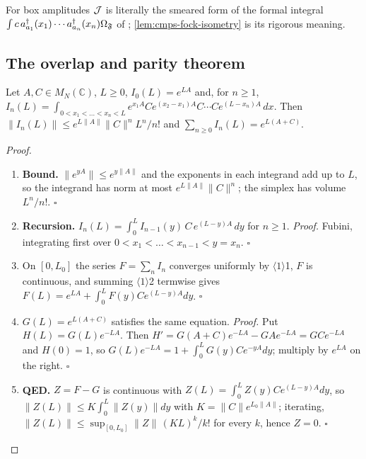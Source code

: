 For box amplitudes $\mathcal J$ is literally the smeared form of the formal integral
$\int c\,a^\dagger_{a_1}(x_1)\cdots a^\dagger_{a_n}(x_n)\Omega_{\mathfrak F}$ of
\cite{haegeman2013calculus}; \cref{lem:cmps-fock-isometry} is its rigorous meaning.

\subsection{The overlap and parity theorem}

\begin{lemma}
\label{lem:dyson-series}
Let $A,C\in M_N(\mathbb C)$, $L\ge0$, $I_0(L)=e^{LA}$ and, for $n\ge1$,
$I_n(L)=\int_{0<x_1<\dots<x_n<L}e^{x_1A}Ce^{(x_2-x_1)A}C\cdots Ce^{(L-x_n)A}\,dx$. Then
$\|I_n(L)\|\le e^{L\|A\|}\|C\|^nL^n/n!$ and $\sum_{n\ge0}I_n(L)=e^{L(A+C)}$.
\end{lemma}

\begin{proof}
\begin{enumerate}
\item[$\langle1\rangle$1.] \textbf{Bound.} $\|e^{yA}\|\le e^{y\|A\|}$ and the exponents in each
integrand add up to $L$, so the integrand has norm at most $e^{L\|A\|}\|C\|^n$; the simplex has
volume $L^n/n!$. $\square$
\item[$\langle1\rangle$2.] \textbf{Recursion.} $I_n(L)=\int_0^LI_{n-1}(y)\,C\,e^{(L-y)A}\,dy$
for $n\ge1$. \emph{Proof.} Fubini, integrating first over $0<x_1<\dots<x_{n-1}<y=x_n$. $\square$
\item[$\langle1\rangle$3.] On $[0,L_0]$ the series $F=\sum_nI_n$ converges uniformly by
$\langle1\rangle$1, $F$ is continuous, and summing $\langle1\rangle$2 termwise gives
$F(L)=e^{LA}+\int_0^LF(y)Ce^{(L-y)A}dy$. $\square$
\item[$\langle1\rangle$4.] $G(L)=e^{L(A+C)}$ satisfies the same equation. \emph{Proof.} Put
$H(L)=G(L)e^{-LA}$. Then $H'=G(A+C)e^{-LA}-GAe^{-LA}=GCe^{-LA}$ and $H(0)=1$, so
$G(L)e^{-LA}=1+\int_0^LG(y)Ce^{-yA}dy$; multiply by $e^{LA}$ on the right. $\square$
\item[$\langle1\rangle$5.] \textbf{QED.} $Z=F-G$ is continuous with
$Z(L)=\int_0^LZ(y)Ce^{(L-y)A}dy$, so $\|Z(L)\|\le K\int_0^L\|Z(y)\|dy$ with
$K=\|C\|e^{L_0\|A\|}$; iterating, $\|Z(L)\|\le\sup_{[0,L_0]}\|Z\|\,(KL)^k/k!$ for every $k$,
hence $Z=0$. $\square$
\end{enumerate}
\end{proof}

